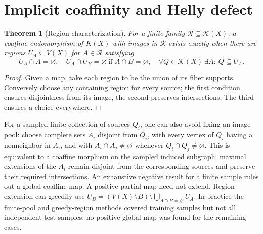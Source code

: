 \documentclass[11pt,a4paper]{article}
\newtheorem{theorem}{Theorem}[section]
\theoremstyle{definition}\newtheorem{definition}[theorem]{Definition}\newtheorem{example}[theorem]{Example}
\theoremstyle{remark}\newtheorem{remark}[theorem]{Remark}
\newcommand{\cl}{\mathcal K}
\begin{document}
\section{Implicit coaffinity and Helly defect}\label{sec:defect}
\begin{theorem}[Region characterization]
For a finite family \(\mathcal R\subseteq\cl(X)\), a coaffine endomorphism of \(K(X)\) with images in \(\mathcal R\) exists exactly when there are regions \(U_A\subseteq V(X)\) for \(A\in\mathcal R\) satisfying
\[
 U_A\cap A=\varnothing,\quad U_A\cap U_B=\varnothing\ \text{if }A\cap B=\varnothing,
 \quad \forall Q\in\cl(X)\ \exists A:\ Q\subseteq U_A.
\]
\end{theorem}
\begin{proof}
Given a map, take each region to be the union of its fiber supports. Conversely choose any containing region for every source; the first condition ensures disjointness from its image, the second preserves intersections. The third ensures a choice everywhere.
\end{proof}
For a sampled finite collection of sources \(Q_i\), one can also avoid fixing an image pool: choose complete sets \(A_i\) disjoint from \(Q_i\), with every vertex of \(Q_i\) having a nonneighbor in \(A_i\), and with \(A_i\cap A_j\ne\varnothing\) whenever \(Q_i\cap Q_j\ne\varnothing\). This is equivalent to a coaffine morphism on the sampled induced subgraph: maximal extensions of the \(A_i\) remain disjoint from the corresponding sources and preserve their required intersections. An exhaustive negative result for a finite sample rules out a global coaffine map. A positive partial map need not extend. Region extension can greedily use \(U_B=(V(X)\setminus B)\setminus\bigcup_{A\cap B=\varnothing}U_A\). In practice the finite-pool and greedy-region methods covered training samples but not all independent test samples; no positive global map was found for the remaining cases.
\end{document}
